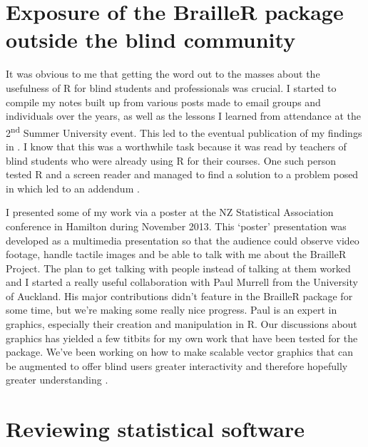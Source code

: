 \documentclass[
]{book}
\begin{document}
\hypertarget{exposure-of-the-brailler-package-outside-the-blind-community}{%
\section{Exposure of the BrailleR package outside the blind community}\label{exposure-of-the-brailler-package-outside-the-blind-community}}

It was obvious to me that getting the word out to the masses about the usefulness of R for blind students and professionals was crucial. I started to compile my notes built up from various posts made to email groups and individuals over the years, as well as the lessons I learned from attendance at the 2\textsuperscript{nd} Summer University event. This led to the eventual publication of my findings in \citep{GodfreyRJournal}. I know that this was a worthwhile task because it was read by teachers of blind students who were already using R for their courses. One such person tested R and a screen reader and managed to find a solution to a problem posed in \citet{GodfreyRJournal} which led to an addendum \citep{GodfreyErhardtRJournalAddendum}.

I presented some of my work via a poster \citep{Godfrey2013BlindnessPoster} at the NZ Statistical Association conference in Hamilton during November 2013. This `poster' presentation was developed as a multimedia presentation so that the audience could observe video footage, handle tactile images and be able to talk with me about the BrailleR Project. The plan to get talking with people instead of talking at them worked and I started a really useful collaboration with Paul Murrell from the University of Auckland. His major contributions didn't feature in the BrailleR package for some time, but we're making some really nice progress. Paul is an expert in graphics, especially their creation and manipulation in R. Our discussions about graphics has yielded a few titbits for my own work that have been tested for the package. We've been working on how to make scalable vector graphics that can be augmented to offer blind users greater interactivity and therefore hopefully greater understanding \citep[see][]{GodfreyMurrell2016TactileGraphsPaper}.

\hypertarget{reviewing-statistical-software}{%
\section{Reviewing statistical software}\label{reviewing-statistical-software}}
\end{document}
